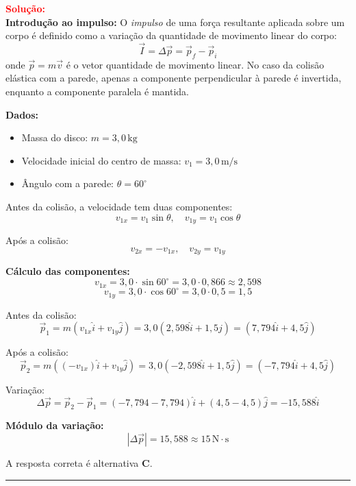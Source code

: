 \begin{flushleft}
\textcolor{red}{\textbf{Solução:}}\\

\textbf{Introdução ao impulso:}  
O \textit{impulso} de uma força resultante aplicada sobre um corpo é definido como a variação da quantidade de movimento linear do corpo:  
\[
\vec{I} = \Delta\vec{p} = \vec{p}_f - \vec{p}_i
\]
onde $\vec{p} = m\vec{v}$ é o vetor quantidade de movimento linear.  
No caso da colisão elástica com a parede, apenas a componente perpendicular à parede é invertida, enquanto a componente paralela é mantida.

\vspace{0.3cm}

\textbf{Dados:}
\begin{itemize}
\item Massa do disco: $m = 3{,}0\,\mathrm{kg}$
\item Velocidade inicial do centro de massa: $v_1 = 3{,}0\,\mathrm{m/s}$
\item Ângulo com a parede: $\theta = 60^\circ$
\end{itemize}

Antes da colisão, a velocidade tem duas componentes:
\[
v_{1x} = v_1\sin\theta, \quad v_{1y} = v_1\cos\theta
\]

Após a colisão:
\[
v_{2x} = -v_{1x}, \quad v_{2y} = v_{1y}
\]

\textbf{Cálculo das componentes:}
\[
v_{1x} = 3{,}0\cdot\sin 60^\circ = 3{,}0\cdot 0{,}866 \approx 2{,}598
\]
\[
v_{1y} = 3{,}0\cdot\cos 60^\circ = 3{,}0\cdot 0{,}5 = 1{,}5
\]

Antes da colisão:
\[
\vec{p}_1 = m(v_{1x}\hat{i} + v_{1y}\hat{j}) = 3{,}0(2{,}598\hat{i} + 1{,}5\hat{j}) = (7{,}794\hat{i} + 4{,}5\hat{j})
\]

Após a colisão:
\[
\vec{p}_2 = m((-v_{1x})\hat{i} + v_{1y}\hat{j}) = 3{,}0(-2{,}598\hat{i} + 1{,}5\hat{j}) = (-7{,}794\hat{i} + 4{,}5\hat{j})
\]

Variação:
\[
\Delta\vec{p} = \vec{p}_2 - \vec{p}_1 = (-7{,}794 - 7{,}794)\hat{i} + (4{,}5 - 4{,}5)\hat{j} = -15{,}588\hat{i}
\]

\textbf{Módulo da variação:}
\[
|\Delta\vec{p}| = 15{,}588 \approx 15\,\mathrm{N\cdot s}
\]

\vspace{0.3cm}

A resposta correta é alternativa \colorbox{green!50}{\textbf{C}}.

\end{flushleft}

\noindent\rule{\linewidth}{0.6pt}\\


